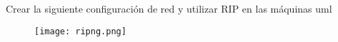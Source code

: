 Crear la siguiente configuración de red y utilizar RIP en las
máquinas uml

\begin{figure}[h]
  \texttt{[image: ripng.png]}
  \centering
\end{figure}